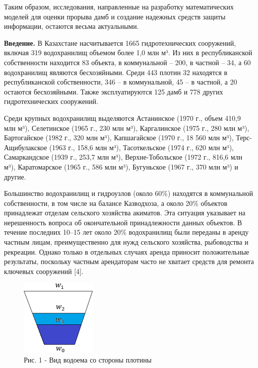 \begin{multicols}{2}
Таким образом, исследования, направленные на разработку математических
моделей для оценки прорыва дамб и создание надежных средств защиты
информации, остаются весьма актуальными.

{\bfseries Введение.} В Казахстане насчитывается 1665 гидротехнических
сооружений, включая 319 водохранилищ объемом более 1,0 млн м³. Из них в
республиканской собственности находится 83 объекта, в коммунальной --
200, в частной -- 34, а 60 водохранилищ являются бесхозяйными. Среди 443
плотин 32 находятся в республиканской собственности, 346 -- в
коммунальной, 45 -- в частной, а 20 остаются бесхозяйными. Также
эксплуатируются 125 дамб и 778 других гидротехнических сооружений.

Среди крупных водохранилищ выделяются Астанинское (1970 г., объем 410,9
млн м³), Селетинское (1965 г., 230 млн м³), Каргалинское (1975 г., 280
млн м³), Бартогайское (1982 г., 320 млн м³), Капшагайское (1970 г., 18
560 млн м³), Терс-Ащибулакское (1963 г., 158,6 млн м³), Тасоткельское
(1974 г., 620 млн м³), Самаркандское (1939 г., 253,7 млн м³),
Верхне-Тобольское (1972 г., 816,6 млн м³), Каратомарское (1965 г., 586
млн м³), Бугуньское (1967 г., 370 млн м³) и другие.

Большинство водохранилищ и гидроузлов (около 60\%) находятся в
коммунальной собственности, в том числе на балансе Казводхоза, а около
20\% объектов принадлежат отделам сельского хозяйства акиматов. Эта
ситуация указывает на нерешенность вопроса об окончательной
принадлежности данных объектов. В течение последних 10--15 лет около
20\% водохранилищ были переданы в аренду частным лицам, преимущественно
для нужд сельского хозяйства, рыбоводства и рекреации. Однако только в
отдельных случаях аренда приносит положительные результаты, поскольку
частным арендаторам часто не хватает средств для ремонта ключевых
сооружений {[}4{]}.

\begin{figure}[H]
	\centering
	\includegraphics[width=0.6\columnwidth]{media/ict/image2}
	\caption*{Рис. 1 - Вид водоема со стороны плотины}
\end{figure}


\end{multicols}
